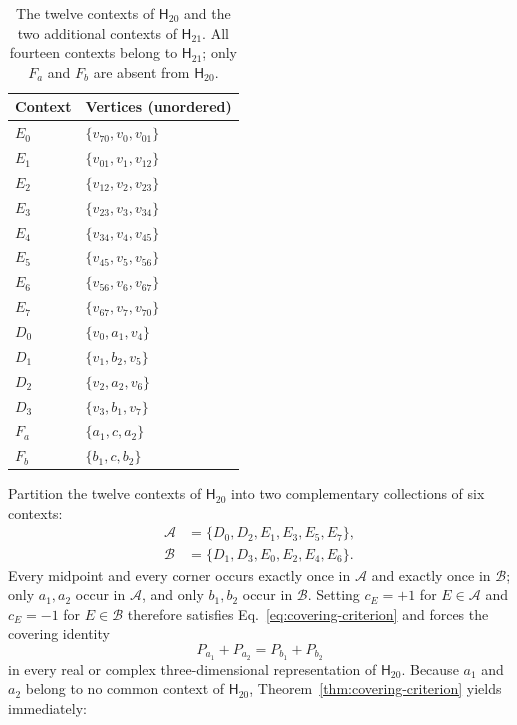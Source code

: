\documentclass[twocolumn,aps,pra,floatfix,amsmath,amssymb,longbibliography]{revtex4-2}
\theoremstyle{definition}
\theoremstyle{remark}
\newcommand{\Htwenty}{\mathsf H_{20}}
\newcommand{\Htwentyone}{\mathsf H_{21}}
\begin{document}
\begin{table}[tb]
\caption{The twelve contexts of $\Htwenty$ and the two additional
contexts of $\Htwentyone$.  All fourteen contexts belong to $\Htwentyone$;
only $F_a$ and $F_b$ are absent from $\Htwenty$.}
\label{tab:contexts}
\centering
\begin{tabular}{@{}ll@{}}
\toprule
Context & Vertices (unordered) \\
\midrule
$E_0$ & $\{v_{70},v_0,v_{01}\}$ \\
$E_1$ & $\{v_{01},v_1,v_{12}\}$ \\
$E_2$ & $\{v_{12},v_2,v_{23}\}$ \\
$E_3$ & $\{v_{23},v_3,v_{34}\}$ \\
$E_4$ & $\{v_{34},v_4,v_{45}\}$ \\
$E_5$ & $\{v_{45},v_5,v_{56}\}$ \\
$E_6$ & $\{v_{56},v_6,v_{67}\}$ \\
$E_7$ & $\{v_{67},v_7,v_{70}\}$ \\
\midrule
$D_0$ & $\{v_0,a_1,v_4\}$ \\
$D_1$ & $\{v_1,b_2,v_5\}$ \\
$D_2$ & $\{v_2,a_2,v_6\}$ \\
$D_3$ & $\{v_3,b_1,v_7\}$ \\
\midrule
$F_a$ & $\{a_1,c,a_2\}$ \\
$F_b$ & $\{b_1,c,b_2\}$ \\
\bottomrule
\end{tabular}
\end{table}

Partition the twelve contexts of $\Htwenty$ into two complementary
collections of six contexts:
\begin{align*}
 \mathcal A&=\{D_0,D_2,E_1,E_3,E_5,E_7\},\\
 \mathcal B&=\{D_1,D_3,E_0,E_2,E_4,E_6\}.
\end{align*}
Every midpoint and every corner occurs exactly once in $\mathcal A$ and
exactly once in $\mathcal B$; only $a_1,a_2$ occur in $\mathcal A$, and only
$b_1,b_2$ occur in $\mathcal B$.  Setting $c_E=+1$ for $E\in\mathcal A$ and
$c_E=-1$ for $E\in\mathcal B$ therefore satisfies
Eq.~\eqref{eq:covering-criterion} and forces the covering identity
\begin{equation}
 P_{a_1}+P_{a_2}=P_{b_1}+P_{b_2}
 \label{eq:covering-identity}
\end{equation}
in every real or complex three-dimensional representation of $\Htwenty$.
Because $a_1$ and $a_2$ belong to no common context of $\Htwenty$,
Theorem~\ref{thm:covering-criterion} yields immediately:
\end{document}
